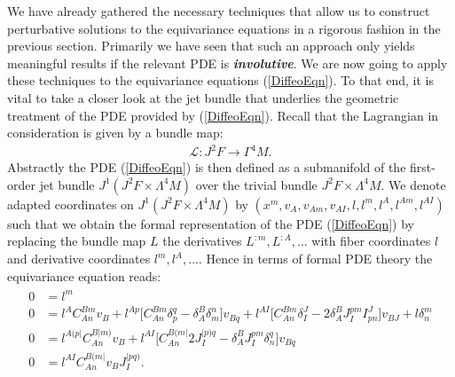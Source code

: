 We have already gathered the necessary techniques that allow us to construct perturbative solutions to the equivariance equations in a rigorous fashion in the previous section. Primarily we have seen that such an approach only yields meaningful results if the relevant PDE is \textit{\textbf{involutive}}. We are now going to apply these techniques to the equivariance equations (\ref{DiffeoEqn}). To that end, it is vital to take a closer look at the jet bundle that underlies the geometric treatment of the PDE provided by (\ref{DiffeoEqn}). Recall that the Lagrangian in consideration is given by a bundle map:
\begin{align}
\mathcal{L} : J^2F \longrightarrow \Gamma^4M.
\end{align}
Abstractly the PDE (\ref{DiffeoEqn}) is then defined as a submanifold of the first-order jet bundle $J^1(J^2F \times \Lambda^4M)$ over the trivial bundle $J^2F \times \Lambda^4M$. 
We denote adapted coordinates on $J^1(J^2F \times \Lambda^4M)$ by $(x^m,v_A,v_{Am},v_{AI},l,l^{m},l^{A},l^{Am},l^{AI})$ such that we obtain the formal representation of the PDE (\ref{DiffeoEqn}) by replacing the bundle map $L$ the derivatives $L^{:m},L^{:A},...$ with fiber coordinates $l$ and derivative coordinates $l^m,l^A,...$. Hence in terms of formal PDE theory the equivariance equation reads:
\begin{align}\label{DiffeoEqnFormal}
\begin{aligned}
    0 &= l^{m} \\
    0 &= l^{A} C_{An}^{Bm} v_B + l^{Ap} \bigl[ C_{An}^{Bm} \delta_p^q - \delta_A^B \delta_m^n \bigr] v_{Bq} + l^{AI} \bigl[ C_{An}^{Bm} \delta_I^J - 2 \delta_A^B J_I^{pm} I^J_{pn}  \bigr] v_{BJ} + l \delta^m_n \\
    0 &= l^{A(p\vert}C_{An}^{B \vert m)} v_B + l^{ AI} \bigl[ C_{An}^{B(m\vert} 2 J_I^{\vert p) q} - \delta^B_A J_I ^{pm} \delta_n^q \bigr] v_{Bq} \\
    0 &= l^{AI} C_{An}^{B(m\vert} v_B J_I^{\vert p q )}.
    \end{aligned}
\end{align}

